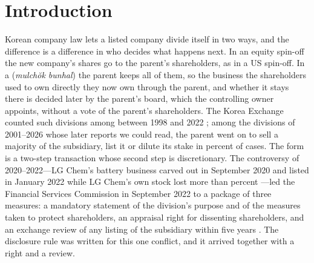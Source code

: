 \section{Introduction}\label{sec:intro}

Korean company law lets a listed company divide itself in two ways, and the difference is a difference in who decides what happens next. In an equity spin-off the new company's shares go to the parent's shareholders, as in a US spin-off. In a \captive{} (\emph{mulchŏk bunhal}) the parent keeps all of them, so the business the shareholders used to own directly they now own through the parent, and whether it stays there is decided later by the parent's board, which the controlling owner appoints, without a vote of the parent's shareholders. The Korea Exchange counted \KLKrxCaptive{} such divisions among \KLKrxTotal{} between 1998 and 2022 \cite{kang2025}; among the \NClean{} divisions of 2001--2026 whose later reports we could read, the parent went on to sell a majority of the subsidiary, list it or dilute its stake in \CleanDisposedShare{} percent of cases. The form is a two-step transaction whose second step is discretionary. The controversy of 2020--2022---LG Chem's battery business carved out in September 2020 and listed in January 2022 while LG Chem's own stock lost more than \KLLGDrop{} percent \cite{kang2025, park2022}---led the Financial Services Commission in September 2022 to a package of three measures: a mandatory statement of the division's purpose and of the measures taken to protect shareholders, an appraisal right for dissenting shareholders, and an exchange review of any listing of the subsidiary within five years \cite{fsc2022a}. The disclosure rule was written for this one conflict, and it arrived together with a right and a review.

